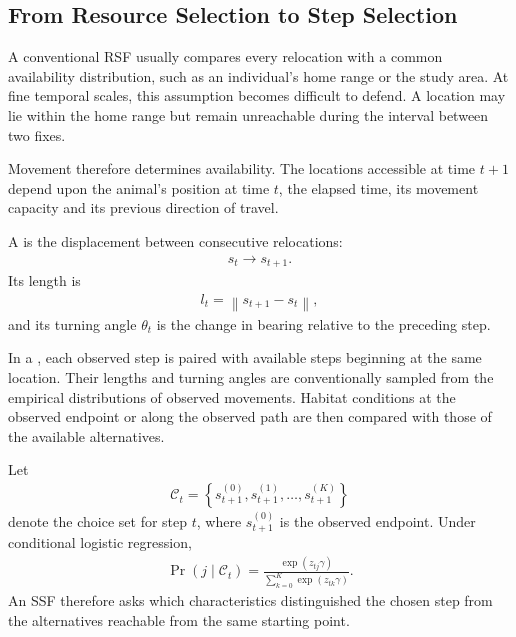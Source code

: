 \documentclass[letterpaper,10pt,english]{sphinxmanual}
\begin{document}
\subsection{From Resource Selection to Step Selection}
\label{\detokenize{theory:from-resource-selection-to-step-selection}}
\sphinxAtStartPar
A conventional RSF usually compares every relocation with a common availability distribution, such as an individual’s home range or the study area. At fine temporal scales, this assumption becomes difficult to defend. A location may lie within the home range but remain unreachable during the interval between two fixes.

\sphinxAtStartPar
Movement therefore determines availability. The locations accessible at time \(t+1\) depend upon the animal’s position at time \(t\), the elapsed time, its movement capacity and its previous direction of travel.

\sphinxAtStartPar
A  is the displacement between consecutive relocations:
\begin{equation*}
\begin{split}
s_t
\longrightarrow
s_{t+1}.
\end{split}
\end{equation*}
\sphinxAtStartPar
Its length is
\begin{equation*}
\begin{split}
l_t
=
\left\|
s_{t+1}-s_t
\right\|,
\end{split}
\end{equation*}
\sphinxAtStartPar
and its turning angle \(\theta_t\) is the change in bearing relative to the preceding step.

\sphinxAtStartPar
In a , each observed step is paired with available steps beginning at the same location. Their lengths and turning angles are conventionally sampled from the empirical distributions of observed movements. Habitat conditions at the observed endpoint or along the observed path are then compared with those of the available alternatives.

\sphinxAtStartPar
Let
\begin{equation*}
\begin{split}
\mathcal{C}_t
=
\left\{
s_{t+1}^{(0)},
s_{t+1}^{(1)},
\ldots,
s_{t+1}^{(K)}
\right\}
\end{split}
\end{equation*}
\sphinxAtStartPar
denote the choice set for step \(t\), where \(s_{t+1}^{(0)}\) is the observed endpoint. Under conditional logistic regression,
\begin{equation*}
\begin{split}
\Pr
\left(
j\mid\mathcal{C}_t
\right)
=
\frac{
\exp\left(z_{tj}\gamma\right)
}{
\displaystyle
\sum_{k=0}^{K}
\exp\left(z_{tk}\gamma\right)
}.
\end{split}
\end{equation*}
\sphinxAtStartPar
An SSF therefore asks which characteristics distinguished the chosen step from the alternatives reachable from the same starting point.
\end{document}
